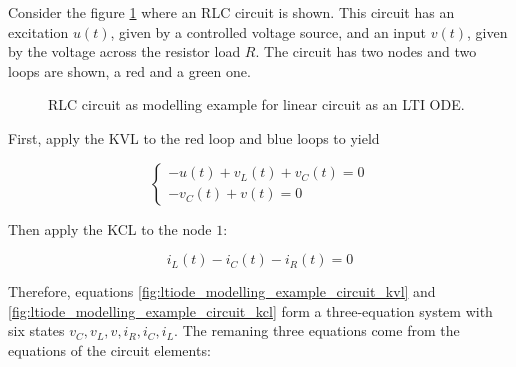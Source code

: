 \begin{example}\label{example:rlc_circuit_lti_ode_example} %
	Consider the figure \ref{fig:ltiode_modelling_example_circuit} where an RLC circuit is shown. This circuit has an excitation $u(t)$, given by a controlled voltage source, and an input $v(t)$, given by the voltage across the resistor load $R$. The circuit has two nodes and two loops are shown, a red and a green one.

\begin{figure}[htb!]
\centering
{}
	\caption{RLC circuit as modelling example for linear circuit as an LTI ODE.}
	\label{fig:ltiode_modelling_example_circuit}
\end{figure} %

	First, apply the KVL to the red loop and blue loops to yield

\begin{equation}
	\left\{\begin{array}{l}
		-u(t) + v_L(t) + v_C(t) = 0 \\[3mm]
		-v_C(t) + v(t) = 0
	\end{array}\right. \label{fig:ltiode_modelling_example_circuit_kvl}
\end{equation}

	Then apply the KCL to the node $1$:

\begin{equation} i_L(t) - i_C(t) - i_R(t) = 0 \label{fig:ltiode_modelling_example_circuit_kcl} \end{equation}

	Therefore, equations \eqref{fig:ltiode_modelling_example_circuit_kvl} and \eqref{fig:ltiode_modelling_example_circuit_kcl} form a three-equation system with six states $v_C,v_L,v,i_R,i_C,i_L$. The remaning three equations come from the equations of the circuit elements:


\end{example}
